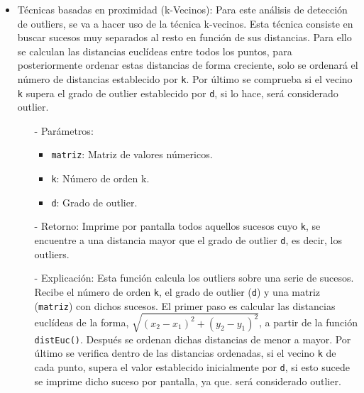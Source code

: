 \documentclass[a4paper, 12pt]{article}
\begin{document}
		\begin{itemize}
			\item Técnicas basadas en proximidad (k-Vecinos): Para este análisis de detección de outliers, se va a hacer uso de la técnica k-vecinos. Esta técnica consiste en buscar sucesos muy separados al resto en función de sus distancias. Para ello se calculan las distancias euclídeas entre todos los puntos, para posteriormente ordenar estas distancias de forma creciente, solo se ordenará el número de distancias establecido por \texttt{k}. Por último se comprueba si el vecino \texttt{k} supera el grado de outlier establecido por \texttt{d}, si lo hace, será considerado outlier.
			\begin{itemize}
				\item[-] Parámetros:
				\begin{itemize}
					\item \texttt{matriz}: Matriz de valores númericos.
					\item \texttt{k}: Número de orden k.
					\item \texttt{d}: Grado de outlier.
				\end{itemize}
				
				\item[-] Retorno: Imprime por pantalla todos aquellos sucesos cuyo \texttt{k}, se encuentre a una distancia mayor que el grado de outlier \texttt{d}, es decir, los outliers.
				
				\item[-] Explicación: Esta función calcula los outliers sobre una serie de sucesos. Recibe el número de orden \texttt{k}, el grado de outlier (\texttt{d}) y una matriz (\texttt{matriz}) con dichos sucesos. El primer paso es calcular las distancias euclídeas de la forma, \texttt{$\sqrt{(x_2 - x_1)^2 + (y_2 - y_1)^2}$}, a partir de la función \texttt{distEuc()}. Después se ordenan dichas distancias de menor a mayor. Por último se verifica dentro de las distancias ordenadas, si el vecino \texttt{k} de cada punto, supera el valor establecido inicialmente por \texttt{d}, si esto sucede se imprime dicho suceso por pantalla, ya que. será considerado outlier.


\end{itemize}
\end{itemize}
\end{document}
